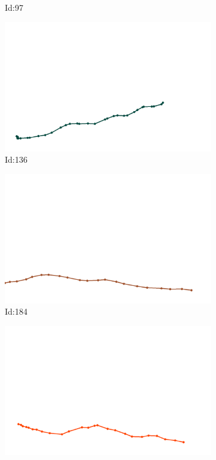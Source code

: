 \documentclass[12pt,twoside]{report}
\begin{document}
\begin{figure}
\begin{subfigure}[b]{0.20\textwidth}
\caption{Id:97}
\end{subfigure}
\begin{subfigure}[b]{0.20\textwidth}
\centering
\includegraphics[width=\textwidth]{../trajectories/136.png}
\caption{Id:136}
\end{subfigure}
\begin{subfigure}[b]{0.20\textwidth}
\centering
\includegraphics[width=\textwidth]{../trajectories/184.png}
\caption{Id:184}
\end{subfigure}
\begin{subfigure}[b]{0.20\textwidth}
\centering
\includegraphics[width=\textwidth]{../trajectories/188.png}

\end{subfigure}
\end{figure}
\end{document}
